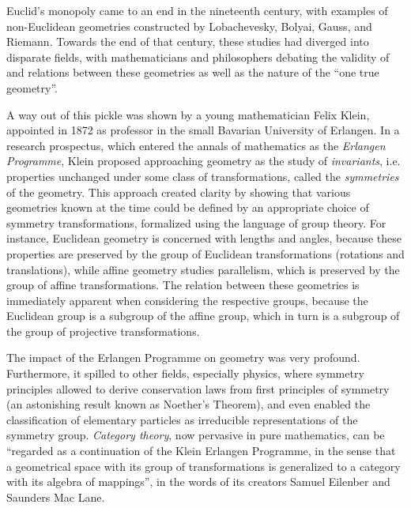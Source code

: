 \documentclass[11pt]{book}              %
\begin{document}
%
Euclid's monopoly came to an end in the nineteenth century, with examples of non-Euclidean geometries constructed by Lobachevesky, Bolyai, Gauss, and Riemann. 
%
%
Towards the end of that century, these studies had diverged into disparate fields, with 
mathematicians and philosophers debating the validity of and relations between these geometries as well as the nature of the ``one true geometry''. 


A way out of this pickle was shown by a young mathematician Felix Klein, appointed in 1872 as professor in the small Bavarian University of Erlangen. In a research prospectus, which entered the annals of mathematics as the \emph{Erlangen Programme}, Klein proposed approaching geometry as the study of {\em invariants}, i.e. properties unchanged under some class of transformations, called the {\em symmetries} of the geometry.
%
This approach created clarity by showing that various geometries known at the time could be defined by an appropriate choice of symmetry transformations, formalized using the language of group theory. 
%
For instance, Euclidean geometry is concerned with lengths and angles, because these properties are preserved by the group of Euclidean transformations (rotations and translations), while affine geometry studies parallelism, which is preserved by the group of affine transformations. 
%
The relation between these geometries is immediately apparent when considering the respective groups, because the Euclidean group is a subgroup of the affine group, which in turn is a subgroup of the group of projective transformations. 


The impact of the Erlangen Programme on geometry was very profound.
Furthermore, it spilled to other fields, especially physics, where symmetry principles allowed to derive conservation laws from first principles of symmetry (an astonishing result known as Noether's Theorem), 
and even enabled the classification of elementary particles as irreducible representations of the symmetry group.
%
{\em Category theory}, 
now pervasive in pure mathematics,
can be ``regarded as a continuation of the Klein Erlangen Programme, in the sense that a geometrical space with its group of transformations is generalized to a category with its algebra of mappings'', in the words of its creators Samuel Eilenber and Saunders Mac Lane. 
\end{document}
